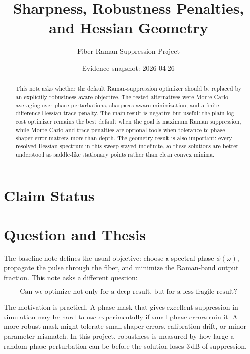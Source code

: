 \documentclass[11pt]{article}
\title{Sharpness, Robustness Penalties, and Hessian Geometry}
\author{Fiber Raman Suppression Project}
\date{Evidence snapshot: 2026-04-26}
\begin{document}
\maketitle

\begin{abstract}
This note asks whether the default Raman-suppression optimizer should be
replaced by an explicitly robustness-aware objective. The tested alternatives
were Monte Carlo averaging over phase perturbations, sharpness-aware
minimization, and a finite-difference Hessian-trace penalty. The main result is
negative but useful: the plain log-cost optimizer remains the best default when
the goal is maximum Raman suppression, while Monte Carlo and trace penalties
are optional tools when tolerance to phase-shaper error matters more than
depth. The geometry result is also important: every resolved Hessian spectrum
in this sweep stayed indefinite, so these solutions are better understood as
saddle-like stationary points rather than clean convex minima.
\end{abstract}

\section*{Claim Status}

\section{Question and Thesis}

The baseline note defines the usual objective: choose a spectral phase
\(\phi(\omega)\), propagate the pulse through the fiber, and minimize the
Raman-band output fraction. This note asks a different question:

\[
    \text{Can we optimize not only for a deep result, but for a less fragile
    result?}
\]

The motivation is practical. A phase mask that gives excellent suppression in
simulation may be hard to use experimentally if small phase errors ruin it. A
more robust mask might tolerate small shaper errors, calibration drift, or
minor parameter mismatch. In this project, robustness is measured by how large
a random phase perturbation can be before the solution loses \(3\,\mathrm{dB}\)
of suppression.
\end{document}
